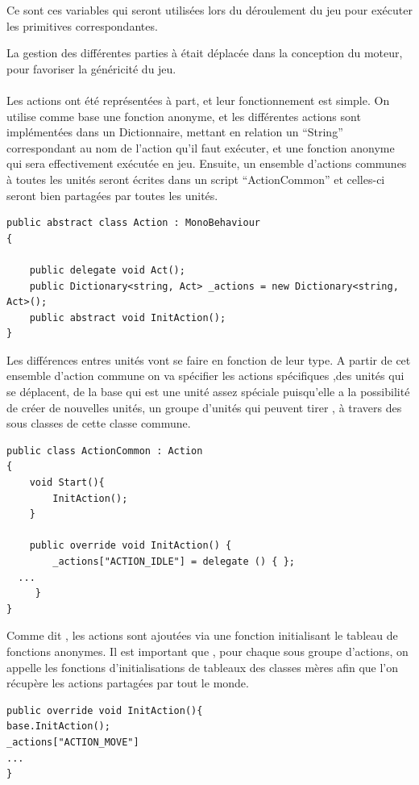 \documentclass{report}
\begin{document}
Ce sont ces variables qui seront utilisées lors du déroulement du jeu pour exécuter les primitives correspondantes.

La gestion des différentes parties à était déplacée dans la conception du moteur, pour favoriser la généricité du jeu.
\paragraph{}

Les actions ont été représentées à part, et leur fonctionnement est simple. On utilise comme base une fonction anonyme, et les différentes actions sont implémentées dans un Dictionnaire, mettant en relation un “String” correspondant au nom de l’action qu’il faut exécuter, et une fonction anonyme qui sera effectivement exécutée en jeu. Ensuite, un ensemble d’actions communes à toutes les unités seront écrites dans un script “ActionCommon” et celles-ci seront bien partagées par toutes les unités. 

\begin{lstlisting}[frame=single]
public abstract class Action : MonoBehaviour
{

    public delegate void Act();
    public Dictionary<string, Act> _actions = new Dictionary<string, Act>();
    public abstract void InitAction();
}
\end{lstlisting}

Les différences entres unités vont se faire en fonction de leur type. A partir de cet ensemble d’action commune on va spécifier les actions spécifiques ,des unités qui se déplacent, de la base qui est une unité assez spéciale puisqu’elle a la possibilité de créer de nouvelles unités,  un groupe d’unités qui peuvent tirer , à travers des sous classes de cette classe commune.

\begin{lstlisting}[frame=single]
public class ActionCommon : Action
{
    void Start(){
        InitAction();
    }

    public override void InitAction() {
        _actions["ACTION_IDLE"] = delegate () { };
  ...
     }
}
\end{lstlisting}

Comme dit , les actions sont ajoutées via une fonction initialisant le tableau de fonctions anonymes. Il est important que , pour chaque sous groupe d’actions, on appelle les fonctions d’initialisations de tableaux des classes mères afin que l’on récupère les actions partagées par tout le monde.
\begin{lstlisting}[frame=single]
  public override void InitAction(){
base.InitAction();
_actions["ACTION_MOVE"] 
...
}
\end{lstlisting}
\end{document}
